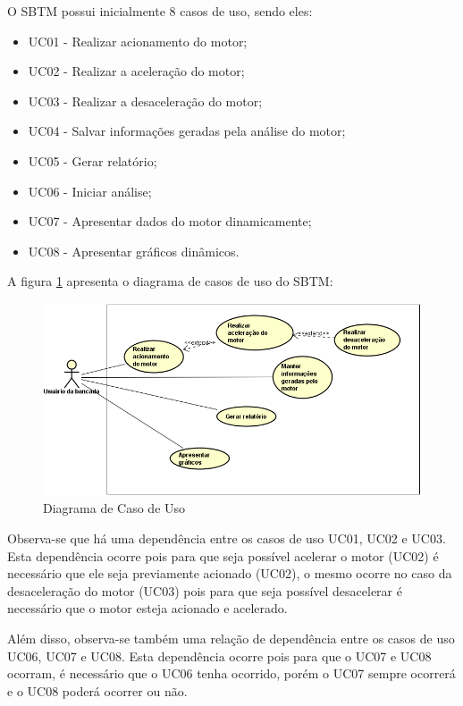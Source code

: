 \begin{anexosenv}
O SBTM possui inicialmente 8 casos de uso, sendo eles:

\begin{itemize}
	\item UC01 - Realizar acionamento do motor;
	\item UC02 - Realizar a aceleração do motor;
	\item UC03 - Realizar a desaceleração do motor;
	\item UC04 - Salvar informações geradas pela análise do motor;
	\item UC05 - Gerar relatório;
	\item UC06 - Iniciar análise;
	\item UC07 - Apresentar dados do motor dinamicamente;
	\item UC08 - Apresentar gráficos dinâmicos.
\end{itemize}

A figura \ref{diagramaCasoDeUso} apresenta o diagrama de casos de uso do SBTM:

\begin{figure}[h!]
	\centering
	\includegraphics[keepaspectratio=true,scale= 0.7]{figuras/DiagramaDeCasoDeUso.PNG}
	\caption{Diagrama de Caso de Uso}
	\label{diagramaCasoDeUso}
\end{figure}

Observa-se que há uma dependência entre os casos de uso UC01, UC02 e UC03. Esta dependência ocorre pois para que seja possível acelerar o motor (UC02) é necessário que ele seja previamente acionado (UC02), o mesmo ocorre no caso da desaceleração do motor (UC03) pois para que seja possível desacelerar é necessário que o motor esteja acionado e acelerado.

Além disso, observa-se também uma relação de dependência entre os casos de uso UC06, UC07 e UC08. Esta dependência ocorre pois para que o UC07 e UC08 ocorram, é necessário que o UC06 tenha ocorrido, porém o UC07 sempre ocorrerá e o UC08 poderá ocorrer ou não.


\end{anexosenv}
